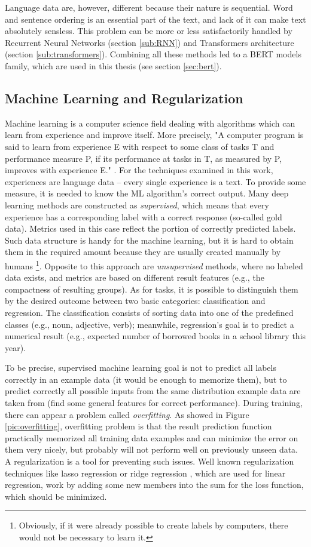 Language data are, however, different because their nature is sequential. Word and sentence ordering is an essential part of the text, and lack of it can make text absolutely sensless. This problem can be more or less satisfactorily handled by Recurrent Neural Networks (section \ref{sub:RNN}) and Transformers architecture (section \ref{sub:transformers}). Combining all these methods led to a BERT models family, which are used in this thesis (see section \ref{sec:bert}).

\subsection{Machine Learning and Regularization}
\label{sub:ml}
Machine learning is a computer science field dealing with algorithms which can learn from experience and improve itself. More precisely, "A computer program is said to learn from experience E with respect to some class of tasks T and performance measure P, if its performance at tasks in T, as measured by P, improves with experience E." \citep{Mitchell1997}. For the techniques examined in this work, experiences are language data -- every single experience is a text. To provide some measure, it is needed to know the ML algorithm's correct output. Many deep learning methods are constructed as \textit{supervised}, which means that every experience has a corresponding label with a correct response (so-called gold data). Metrics used in this case reflect the portion of correctly predicted labels. \citep{Russell1995} Such data structure is handy for the machine learning, but it is hard to obtain them in the required amount because they are usually created manually by humans \footnote{Obviously, if it were already possible to create labels by computers, there would not be necessary to learn it.}. Opposite to this approach are \textit{unsupervised} methods, where no labeled data exists, and metrics are based on different result features (e.g., the compactness of resulting groups). As for tasks, it is possible to distinguish them by the desired outcome between two basic categories: classification and regression. The classification consists of sorting data into one of the predefined classes (e.g., noun, adjective, verb); meanwhile, regression's goal is to predict a numerical result (e.g., expected number of borrowed books in a school library this year).
\par
To be precise, supervised machine learning goal is not to predict all labels correctly in an example data (it would be enough to memorize them), but to predict correctly all possible inputs from the same distribution example data are taken from (find some general features for correct performance). During training, there can appear a problem called \textit{overfitting}. As showed in Figure \ref{pic:overfitting}, overfitting problem is that the result prediction function practically memorized all training data examples and can minimize the error on them very nicely, but probably will not perform well on previously unseen data. A regularization is a tool for preventing such issues. Well known regularization techniques like lasso regression \citep{Tibshirani1996} or ridge regression \citep{Hoerl1970}, which are used for linear regression, work by adding some new members into the sum for the loss function, which should be minimized.
